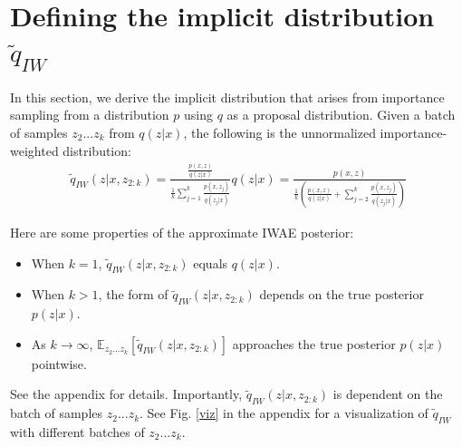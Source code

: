 \documentclass{article} %
\begin{document}






\section{Defining the implicit distribution \texorpdfstring{$\tilde{q}_{IW}$}{}}


In this section, we derive the implicit distribution that arises from importance sampling from a distribution $p$ using $q$ as a proposal distribution. Given a batch of samples $z_{2}...z_{k}$ from $q(z|x)$, the following is the unnormalized importance-weighted distribution:
\begin{align} 
    \tilde{q}_{IW}(z|x,z_{2:k}) =  \frac{ \frac{p(x,z)}{q(z|x)}}{  \frac{1}{k}   \sum_{j=1}^k \frac{p(x,z_j)}{q(z_j|x)}}   q(z|x)
    = \frac{p(x,z)}{\frac{1}{k} \left(  \frac{p(x,z)}{q(z|x)}+ \sum_{j=2}^k \frac{p(x,z_j)}{q(z_j|x)} \right)} 
\label{eq:qiw}
\end{align}

Here are some properties of the approximate IWAE posterior: %
\begin{itemize}
    \item When $k=1$, $\tilde{q}_{IW}(z|x,z_{2:k})$ equals $q(z|x)$.
    \item When $k > 1$, the form of $\tilde{q}_{IW}(z|x,z_{2:k})$ depends on the true posterior $p(z|x)$.
    \item As $k \rightarrow \infty$, $\mathbb{E}_{z_2...z_k} \left[ \tilde{q}_{IW}(z|x,z_{2:k}) \right]$ approaches the true posterior $p(z|x)$ pointwise.
\end{itemize}
See the appendix for details. Importantly, $\tilde{q}_{IW}(z|x,z_{2:k})$ is dependent on the batch of samples $z_{2}...z_{k}$. See Fig. \ref{viz} in the appendix for a visualization of $\tilde{q}_{IW}$ with different batches of $z_{2}...z_{k}$.
\end{document}
